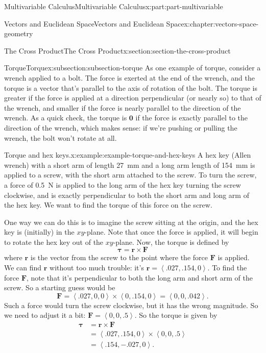 \documentclass[twoside,10pt,]{tufte-book}
\numberwithin{equation}{part}
\newcommand{\dotprod}[1]{\left\langle #1 \right\rangle}
\begin{document}
\begin{partptx}{Multivariable Calculus}{}{Multivariable Calculus}{}{}{x:part:part-multivariable}
\begin{chapterptx}{Vectors and Euclidean Space}{}{Vectors and Euclidean Space}{}{}{x:chapter:vectors-space-geometry}
\begin{sectionptx}{The Cross Product}{}{The Cross Product}{}{}{x:section:section-the-cross-product}
\begin{subsectionptx}{Torque}{}{Torque}{}{}{x:subsection:subsection-torque}
As one example of torque, consider a wrench applied to a bolt. The force is exerted at the end of the wrench, and the torque is a vector that's parallel to the axis of rotation of the bolt. The torque is greater if the force is applied at a direction perpendicular (or nearly so) to that of the wrench, and smaller if the force is nearly parallel to the direction of the wrench. As a quick check, the torque is \(\mathbf{0}\) if the force is exactly parallel to the direction of the wrench, which makes sense: if we're pushing or pulling the wrench, the bolt won't rotate at all.%
\begin{example}{Torque and hex keys.}{x:example:example-torque-and-hex-keys}%
A hex key (Allen wrench) with a short arm of length \SI{27}{\milli\meter} and a long arm length of \SI{154}{\milli\meter} is applied to a screw, with the short arm attached to the screw. To turn the screw, a force of \SI{0.5}{\newton} is applied to the long arm of the hex key turning the screw clockwise, and is exactly perpendicular to both the short arm and long arm of the hex key. We want to find the torque of this force on the screw.%
\par
One way we can do this is to imagine the screw sitting at the origin, and the hex key is (initially) in the \(xy\)-plane. Note that once the force is applied, it will begin to rotate the hex key out of the \(xy\)-plane. Now, the torque is defined by%
%
\begin{equation*}
\boldsymbol{\tau} = \mathbf{r}\times\mathbf{F}
\end{equation*}
where \(\mathbf{r}\) is the vector from the screw to the point where the force \(\mathbf{F}\) is applied. We can find \(\mathbf{r}\) without too much trouble: it's \(\mathbf{r} = \dotprod{.027,.154,0}\). To find the force \(\mathbf{F}\), note that it's perpendicular to both the long arm and short arm of the screw. So a starting guess would be%
%
\begin{equation*}
\mathbf{F} = \dotprod{.027,0,0}\times\dotprod{0,.154,0} = \dotprod{0,0,.042}.
\end{equation*}
Such a force would turn the screw clockwise, but it has the wrong magnitude. So we need to adjust it a bit: \(\mathbf{F} = \dotprod{0,0,.5}\). So the torque is given by%
%
\begin{align*}
\mathbf{\tau} &= \mathbf{r}\times\mathbf{F} \\
& = \dotprod{.027,.154,0}\times\dotprod{0,0,.5} \\
& = \dotprod{.154,-.027,0}. 
\end{align*}

\end{example}
\end{subsectionptx}
\end{sectionptx}
\end{chapterptx}
\end{partptx}
\end{document}
